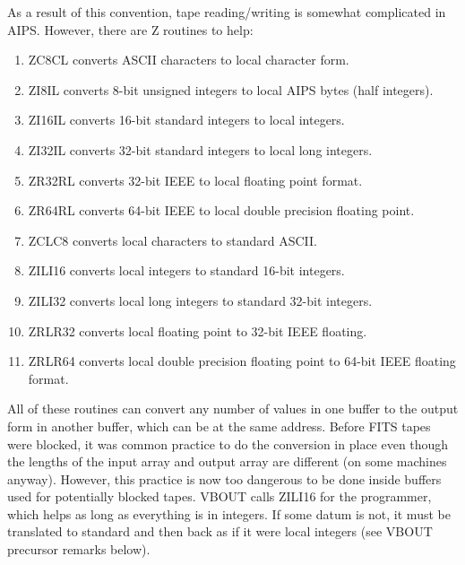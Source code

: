 As a result of this convention, tape reading/writing is somewhat
complicated in AIPS.  However, there are Z routines to help:
\begin{enumerate} %
\item {}
ZC8CL converts ASCII characters to local character form.
\item {}
ZI8IL converts 8-bit unsigned integers to local AIPS bytes (half integers).
\item {}
ZI16IL converts 16-bit standard integers to local integers.
\item {}
ZI32IL converts 32-bit standard integers to local long integers.
\item {}
ZR32RL converts 32-bit IEEE to local floating point format.
\item {}
ZR64RL converts 64-bit IEEE to local double precision floating point.
\item {}
ZCLC8 converts local characters to standard ASCII.
\item {}
ZILI16 converts local integers to standard 16-bit integers.
\item {}
ZILI32 converts local long integers to standard 32-bit integers.
\item {}
ZRLR32 converts local floating point to 32-bit IEEE floating.
\item {}
ZRLR64 converts local double precision floating point to 64-bit
IEEE floating format.
\end{enumerate} %
All of these routines can convert any number of values in one buffer
to the output form in another buffer, which can be at the same
address. Before FITS tapes were blocked, it was common practice to do
the conversion in place even though the lengths of the input array and
output array are different (on some machines anyway).  However, this
practice is now too dangerous to be done inside buffers used for
potentially blocked tapes.  VBOUT calls ZILI16 for the programmer,
which helps as long as everything is in integers.  If some datum
is not, it must be translated to standard and then back as if it were
local integers (see VBOUT precursor remarks below).

